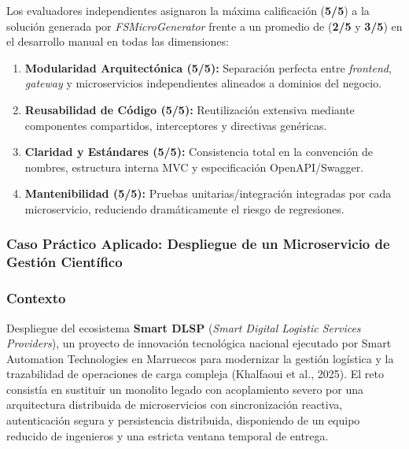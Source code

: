 Los evaluadores independientes asignaron la máxima calificación (\textbf{5/5}) a la solución generada por \textit{FSMicroGenerator} frente a un promedio de (\textbf{2/5} y \textbf{3/5}) en el desarrollo manual en todas las dimensiones: %
\begin{enumerate}
    \item \textbf{Modularidad Arquitectónica (5/5):} Separación perfecta entre \textit{frontend}, \textit{gateway} y microservicios independientes alineados a dominios del negocio. %
    \item \textbf{Reusabilidad de Código (5/5):} Reutilización extensiva mediante componentes compartidos, interceptores y directivas genéricas. %
    \item \textbf{Claridad y Estándares (5/5):} Consistencia total en la convención de nombres, estructura interna MVC y especificación OpenAPI/Swagger. %
    \item \textbf{Mantenibilidad (5/5):} Pruebas unitarias/integración integradas por cada microservicio, reduciendo dramáticamente el riesgo de regresiones. %
\end{enumerate}

\subsubsection{Caso Práctico Aplicado: Despliegue de un Microservicio de Gestión Científico}

\subsubsection*{Contexto}
Despliegue del ecosistema \textbf{Smart DLSP} (\textit{Smart Digital Logistic Services Providers}), un proyecto de innovación tecnológica nacional ejecutado por Smart Automation Technologies en Marruecos para modernizar la gestión logística y la trazabilidad de operaciones de carga compleja (Khalfaoui et al., 2025). El reto consistía en sustituir un monolito legado con acoplamiento severo por una arquitectura distribuida de microservicios con sincronización reactiva, autenticación segura y persistencia distribuida, disponiendo de un equipo reducido de ingenieros y una estricta ventana temporal de entrega.

